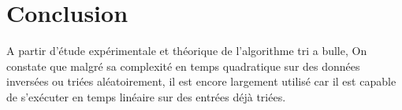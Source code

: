 \section{Conclusion}
A partir d'étude expérimentale et théorique de l'algorithme tri a bulle, On constate que malgré sa complexité en temps quadratique sur des données inversées ou triées aléatoirement, il est encore largement utilisé car il est capable de s'exécuter en temps linéaire sur des entrées déjà triées.